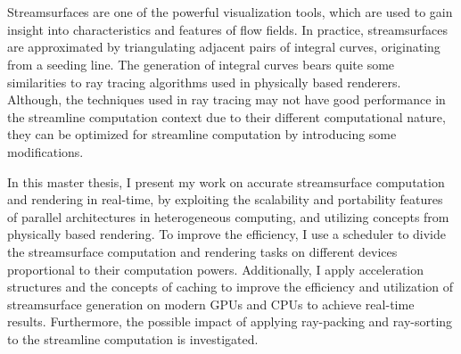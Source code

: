 \chapter{\abstractname}

Streamsurfaces are one of the powerful visualization tools, which are used to gain insight into characteristics and features of flow fields. In practice, streamsurfaces are approximated by triangulating adjacent pairs of integral curves, originating from a seeding line. The generation of integral curves bears quite some similarities to ray tracing algorithms used in physically based renderers. Although, the techniques used in ray tracing may not have good performance in the streamline computation context due to their different computational nature, they can be optimized for streamline computation by introducing some modifications.

In this master thesis, I present my work on accurate streamsurface computation and rendering in real-time, by exploiting the scalability and portability features of parallel architectures in heterogeneous computing, and utilizing concepts from physically based rendering. To improve the efficiency, I use a scheduler to divide the streamsurface computation and rendering tasks on different devices proportional to their computation powers. Additionally, I apply acceleration structures and the concepts of caching to improve the efficiency and utilization of streamsurface generation on modern GPUs and CPUs to achieve real-time results. Furthermore, the possible impact of applying ray-packing and ray-sorting to the streamline computation is investigated.






